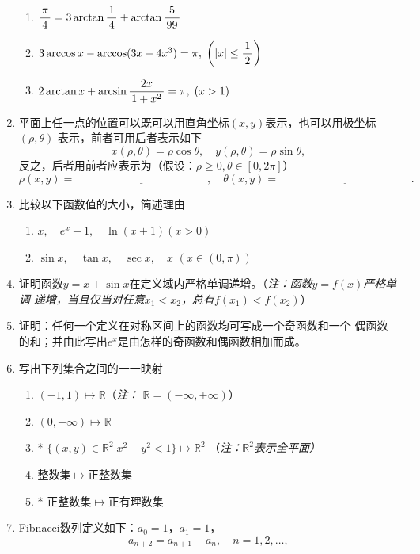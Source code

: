 \begin{enumerate}
  \begin{enumerate}[(1)]
    \item $\displaystyle\frac{\,{\pi}\,}{\,{4}\,}=3\arctan\displaystyle\frac{\,{1}\,}{\,{4}\,}+\arctan\displaystyle\frac{\,{5}\,}{\,{99}\,}$
    \item $3\arccos x-\arccos(3x-4x^3)=\pi,\;\left(|x|\leq\displaystyle\frac{\,{1}\,}{\,{2}\,}\right)$
    \item $2\arctan x+\arcsin\displaystyle\frac{\,{2x}\,}{\,{1+x^2}\,}=\pi,\;(x>1)$
  \end{enumerate}
  \item 平面上任一点的位置可以既可以用直角坐标$(x,y)$表示，也可以用极坐标$(\rho,\theta)$
  表示，前者可用后者表示如下
  $$x(\rho,\theta)=\rho\cos\theta,\quad y(\rho,\theta)=\rho\sin\theta,$$
  反之，后者用前者应表示为（假设：$\rho\geq 0,\theta\in[0,2\pi]$）
  $$\rho(x,y)=\underline{\hspace{5cm}},\quad
  \theta(x,y)=\underline{\hspace{5cm}}.$$
  \item 比较以下函数值的大小，简述理由
  \begin{enumerate}[(1)]
    \item $x,\quad e^x-1,\quad \ln(x+1)$\quad$(x>0)$
    \item $\sin x,\quad \tan x, \quad \sec x, \quad x$ \quad $(x\in(0,\pi))$
  \end{enumerate}
  \item 证明函数$y=x+\sin x$在定义域内严格单调递增。（{\it 注：函数$y=f(x)$严格单调
  递增，当且仅当对任意$x_1<x_2$，总有$f(x_1)<f(x_2)$}）
  \item 证明：任何一个定义在对称区间上的函数均可写成一个奇函数和一个
  偶函数的和；并由此写出$e^x$是由怎样的奇函数和偶函数相加而成。
  \item 写出下列集合之间的一一映射
  \begin{enumerate}[(1)]
    \item $(-1,1)\mapsto\mathbb{R}$\hspace{2cm}（{\it 注：
  $\mathbb{R}=(-\infty,+\infty)$}）
    \item $(0,+\infty)\mapsto\mathbb{R}$
    \item* $\{(x,y)\in\mathbb{R}^2|x^2+y^2<1\}\mapsto\mathbb{R}^2$
    \hspace{2cm}（{\it 注：$\mathbb{R}^2$表示全平面）}
    \item 整数集$\mapsto$正整数集
    \item* 正整数集$\mapsto$正有理数集
  \end{enumerate}
  \item Fibnacci数列定义如下：$a_0=1$，$a_1=1$，
  $$a_{n+2}=a_{n+1}+a_{n},\quad n=1,2,\ldots,$$

\end{enumerate}
